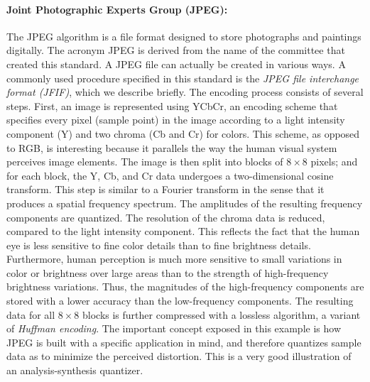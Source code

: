 \paragraph{Joint Photographic Experts Group (JPEG):}
The JPEG algorithm is a file format designed to store photographs and paintings digitally.
The acronym JPEG is derived from the name of the committee that created this standard.
A JPEG file can actually be created in various ways.
A commonly used procedure specified in this standard is the \emph{JPEG file interchange format (JFIF)}, which we describe briefly.
The encoding process consists of several steps.
First, an image is represented using YCbCr, an encoding scheme that specifies every pixel (sample point) in the image according to a light intensity component (Y) and two chroma (Cb and Cr) for colors.
This scheme, as opposed to RGB, is interesting because it parallels the way the human visual system perceives image elements.
The image is then split into blocks of $8 \times 8$ pixels; and for each block, the Y, Cb, and Cr data undergoes a two-dimensional cosine transform.
This step is similar to a Fourier transform in the sense that it produces a spatial frequency spectrum.
The amplitudes of the resulting frequency components are quantized.
The resolution of the chroma data is reduced, compared to the light intensity component.
This reflects the fact that the human eye is less sensitive to fine color details than to fine brightness details.
Furthermore, human perception is much more sensitive to small variations in color or brightness over large areas than to the strength of high-frequency brightness variations.
Thus, the magnitudes of the high-frequency components are stored with a lower accuracy than the low-frequency components.
The resulting data for all $8 \times 8$ blocks is further compressed with a lossless algorithm, a variant of \emph{Huffman encoding}.
The important concept exposed in this example is how JPEG is built with a specific application in mind, and therefore quantizes sample data as to minimize the perceived distortion.
This is a very good illustration of an analysis-synthesis quantizer.


